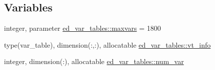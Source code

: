 \subsection*{Variables}
\begin{DoxyCompactItemize}
\item 
integer, parameter \hyperlink{namespaceed__var__tables_a932cd6738531dd3348d40636bd8a20ae}{ed\+\_\+var\+\_\+tables\+::maxvars} = 1800
\item 
type(var\+\_\+table), dimension(\+:,\+:), allocatable \hyperlink{namespaceed__var__tables_a949fa9110a835bd59e16bd0a5e153498}{ed\+\_\+var\+\_\+tables\+::vt\+\_\+info}
\item 
integer, dimension(\+:), allocatable \hyperlink{namespaceed__var__tables_ae879757190201e461d3bc09131321a64}{ed\+\_\+var\+\_\+tables\+::num\+\_\+var}
\end{DoxyCompactItemize}
